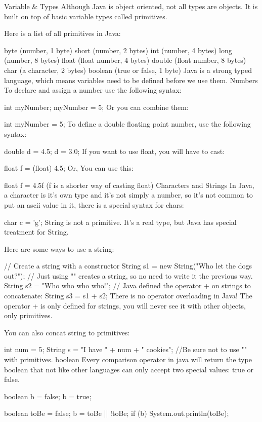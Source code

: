 Variable & Types
Although Java is object oriented, not all types are objects. It is built on top of basic variable types called primitives.

Here is a list of all primitives in Java:

byte (number, 1 byte)
short (number, 2 bytes)
int (number, 4 bytes)
long (number, 8 bytes)
float (float number, 4 bytes)
double (float number, 8 bytes)
char (a character, 2 bytes)
boolean (true or false, 1 byte) Java is a strong typed language, which means variables need to be defined before we use them.
Numbers
To declare and assign a number use the following syntax:

int myNumber;
myNumber = 5;
Or you can combine them:

int myNumber = 5;
To define a double floating point number, use the following syntax:

double d = 4.5;
d = 3.0;
If you want to use float, you will have to cast:

float f = (float) 4.5;
Or, You can use this:

float f = 4.5f (f is a shorter way of casting float)
Characters and Strings
In Java, a character is it's own type and it's not simply a number, so it's not common to put an ascii value in it, there is a special syntax for chars:

char c = 'g';
String is not a primitive. It's a real type, but Java has special treatment for String.

Here are some ways to use a string:

// Create a string with a constructor
String s1 = new String("Who let the dogs out?");
// Just using "" creates a string, so no need to write it the previous way.
String s2 = "Who who who who!";
// Java defined the operator + on strings to concatenate:
String s3 = s1 + s2;
There is no operator overloading in Java! The operator + is only defined for strings, you will never see it with other objects, only primitives.

You can also concat string to primitives:

int num = 5;
String s = "I have " + num + " cookies"; //Be sure not to use "" with primitives.
boolean
Every comparison operator in java will return the type boolean that not like other languages can only accept two special values: true or false.

boolean b = false;
b = true;

boolean toBe = false;
b = toBe || !toBe;
if (b) {
    System.out.println(toBe);
}

